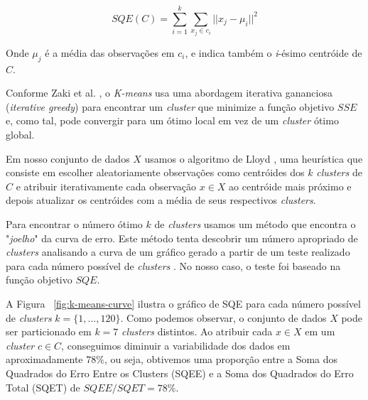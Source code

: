 \begin{displaymath}
  SQE(C) = \sum_{i=1}^{k} \sum_{x_j \in c_i}{} || x_j - \mu _i ||^2
\end{displaymath}

Onde $\mu_j$ é a média das observações em $c_i$, e indica também o \textit{i}-ésimo centróide de $C$.

Conforme Zaki et al. \cite{zaki2014data}, o \textit{K-means} usa uma abordagem iterativa gananciosa (\textit{iterative greedy}) para encontrar um \textit{cluster} que minimize a função objetivo $SSE$ e, como tal, pode convergir para um ótimo local em vez de um \textit{cluster} ótimo global.

Em nosso conjunto de dados $X$ usamos o algoritmo de Lloyd \cite{ong2015player}, uma heurística que consiste em escolher aleatoriamente observações como centróides dos $k$ \textit{clusters} de  $C$ e atribuir iterativamente cada observação $x \in X$ ao centróide mais próximo e depois atualizar os centróides com a média de seus respectivos \textit{clusters}.

Para encontrar o número ótimo $k$ de \textit{clusters} usamos um método que encontra o "\textit{joelho}" da curva de erro. Este método tenta descobrir um número apropriado de \textit{clusters} analisando a curva de um gráfico gerado a partir de um teste realizado para cada número possível de \textit{clusters} \cite{salvador2004determining}. No nosso caso, o teste foi baseado na função objetivo $SQE$.

A Figura ~\ref{fig:k-means-curve} ilustra o gráfico de SQE para cada número possível de \textit{clusters} $k = \{1, ..., 120\}$. Como podemos observar, o conjunto de dados $X$ pode ser particionado em $k=7$ \textit{clusters} distintos. Ao atribuir cada $x \in X$ em um \textit{cluster} $c \in C$, conseguimos diminuir a variabilidade dos dados em aproximadamente $78\%$, ou seja, obtivemos uma proporção entre a Soma dos Quadrados do Erro Entre os Clusters (SQEE) e a Soma dos Quadrados do Erro Total (SQET) de $SQEE/SQET = 78 \%$.

